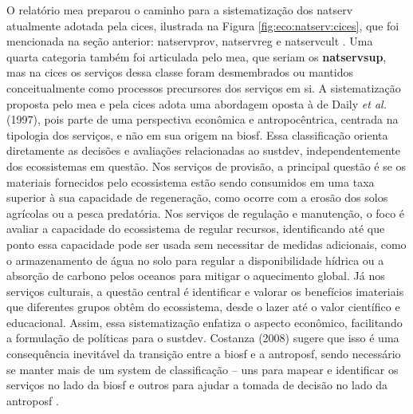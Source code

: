 \documentclass[./main.tex]{subfiles}
\begin{document}
\par O relatório \acrshort{mea} preparou o caminho para a sistematização dos \gls{natserv} atualmente adotada pela \acrfull{cices}, ilustrada na Figura \ref{fig:eco:natserv:cices}, que foi mencionada na seção anterior: \gls{natservprov}, \gls{natservreg} e \gls{natservcult} \cite{Haines-young2018a}. Uma quarta categoria também foi articulada pelo \acrshort{mea}, que seriam os \textbf{\gls{natservsup}}, mas na \acrshort{cices} os serviços dessa classe foram desmembrados ou mantidos conceitualmente como processos precursores dos serviços em si. A sistematização proposta pelo \acrshort{mea} e pela \acrshort{cices} adota uma abordagem oposta à de Daily \textit{et al.} (1997), pois parte de uma perspectiva econômica e antropocêntrica, centrada na tipologia dos serviços, e não em sua origem na \gls{biosf}. Essa classificação orienta diretamente as decisões e avaliações relacionadas ao \gls{sustdev}, independentemente dos ecossistemas em questão. Nos serviços de provisão, a principal questão é se os materiais fornecidos pelo ecossistema estão sendo consumidos em uma taxa superior à sua capacidade de regeneração, como ocorre com a erosão dos solos agrícolas ou a pesca predatória. Nos serviços de regulação e manutenção, o foco é avaliar a capacidade do ecossistema de regular recursos, identificando até que ponto essa capacidade pode ser usada sem necessitar de medidas adicionais, como o armazenamento de água no solo para regular a disponibilidade hídrica ou a absorção de carbono pelos oceanos para mitigar o aquecimento global. Já nos serviços culturais, a questão central é identificar e valorar os benefícios imateriais que diferentes grupos obtêm do ecossistema, desde o lazer até o valor científico e educacional. Assim, essa sistematização enfatiza o aspecto econômico, facilitando a formulação de políticas para o \gls{sustdev}. Costanza (2008) sugere que isso é uma consequência inevitável da transição entre a \gls{biosf} e a \gls{antroposf}, sendo necessário se manter mais de um \gls{system} de classificação -- uns para mapear e identificar os serviços no lado da \gls{biosf} e outros para ajudar a tomada de decisão no lado da \gls{antroposf} \cite{costanza2008}.
\end{document}
